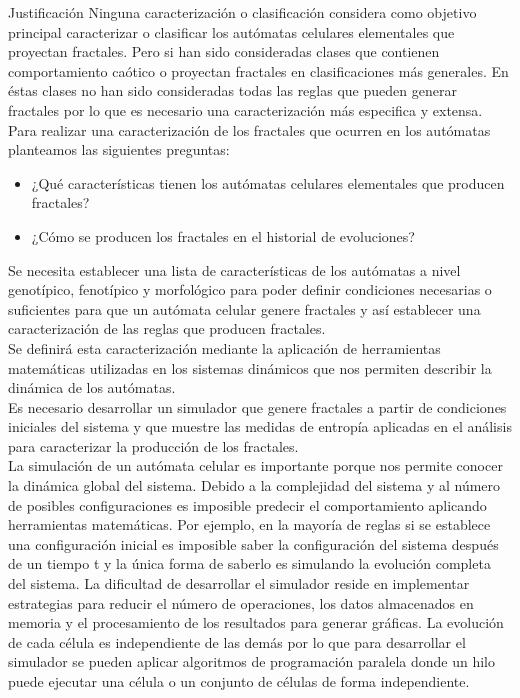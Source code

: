 \documentclass{article}
\begin{document}
    \begin{section}{Justificación}
        \noindent Ninguna caracterización o clasificación  considera como objetivo principal caracterizar o clasificar los autómatas celulares elementales que proyectan fractales. Pero si han sido consideradas clases que contienen comportamiento caótico o proyectan fractales en clasificaciones más generales. En éstas clases no han sido consideradas todas las reglas que pueden generar fractales por lo que es necesario una caracterización más especifica y extensa.\\
        \noindent Para realizar una caracterización de los fractales que ocurren en los autómatas planteamos las siguientes preguntas: 
        \begin{itemize}
            \item ¿Qué características tienen los autómatas celulares elementales que producen fractales?
            \item ¿Cómo se producen los fractales en el historial de evoluciones?
        \end{itemize}   
        \noindent Se necesita establecer una lista de características de los autómatas a nivel genotípico, fenotípico y morfológico para poder definir condiciones necesarias o suficientes para que un autómata celular genere fractales y así establecer una caracterización de las reglas que producen fractales.\\
        \noindent Se definirá esta caracterización mediante la aplicación de herramientas matemáticas utilizadas en los sistemas dinámicos que nos permiten describir la dinámica de los autómatas.\\
        \noindent Es necesario desarrollar un simulador que genere fractales a partir de condiciones iniciales del sistema y que muestre las medidas de entropía aplicadas en el análisis para caracterizar la producción de los fractales.\\
        
        \noindent La simulación de un autómata celular es importante porque nos permite conocer la dinámica global del sistema. Debido a la complejidad del sistema y al número de posibles configuraciones es imposible predecir el comportamiento aplicando herramientas matemáticas. Por ejemplo, en la mayoría de reglas si se establece una configuración inicial es imposible saber la configuración del sistema después de un tiempo t y la única forma de saberlo es simulando la evolución completa del sistema.
        La dificultad de desarrollar el simulador reside en implementar estrategias para reducir el número de operaciones, los datos almacenados en memoria y el procesamiento de los resultados para generar gráficas. La evolución de cada célula es independiente de las demás por lo que para desarrollar el simulador se pueden aplicar algoritmos de programación paralela donde un hilo puede ejecutar una célula o un conjunto de células de forma independiente.\\
    

\end{section}
\end{document}
